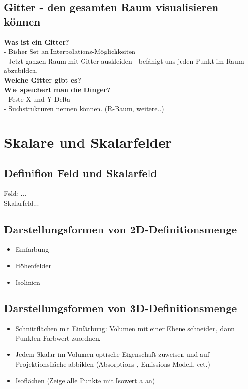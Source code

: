 \documentclass{article}
\begin{document}
\subsection{Gitter - den gesamten Raum visualisieren können}
\noindent \textbf{Was ist ein Gitter?}\\
- Bisher Set an Interpolations-Möglichkeiten\\
- Jetzt ganzen Raum mit Gitter auskleiden - befähigt uns jeden Punkt im Raum abzubilden.\\

\noindent \textbf{Welche Gitter gibt es?}\\

\noindent \textbf{Wie speichert man die Dinger?}\\
- Feste X und Y Delta\\
- Suchstrukturen nennen können. (R-Baum, weitere..)
\pagebreak

\section{Skalare und Skalarfelder}

\subsection{Definifion Feld und Skalarfeld}
Feld: ...\\
Skalarfeld...

\subsection{Darstellungsformen von 2D-Definitionsmenge}
\begin{itemize}[noitemsep]
	\item Einfärbung
	\item Höhenfelder
	\item Isolinien
\end{itemize}

\subsection{Darstellungsformen von 3D-Definitionsmenge}
\begin{itemize}[noitemsep]
	\item Schnittflächen mit Einfärbung: Volumen mit einer Ebene schneiden, dann Punkten Farbwert zuordnen.
	\item Jedem Skalar im Volumen optische Eigenschaft zuweisen und auf Projektionsfläche abbilden (Absorptions-, Emissions-Modell, ect.)
	\item Isoflächen (Zeige alle Punkte mit Isowert a an)
\end{itemize}
\end{document}
